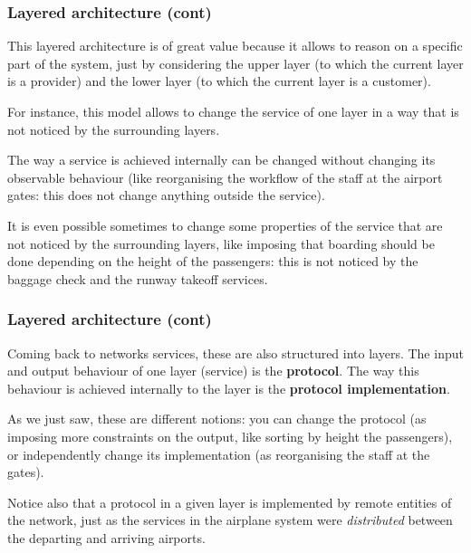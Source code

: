 %
\begin{frame}
\frametitle{Layered architecture (cont)}

This layered architecture is of great value because it allows to
reason on a specific part of the system, just by considering the upper
layer (to which the current layer is a provider) and the lower layer
(to which the current layer is a customer).

\bigskip

For instance, this model allows to change the service of one layer in
a way that is not noticed by the surrounding layers.

\bigskip

The way a service is achieved internally can be changed without
changing its observable behaviour (like reorganising the workflow of
the staff at the airport gates: this does not change anything outside
the service).

\bigskip

It is even possible sometimes to change some properties of the service
that are not noticed by the surrounding layers, like imposing that
boarding should be done depending on the height of the passengers:
this is not noticed by the baggage check and the runway takeoff
services.

\end{frame}

%
\begin{frame}
\frametitle{Layered architecture (cont)}

Coming back to networks services, these are also structured into
layers. The input and output behaviour of one layer (service) is the
\textbf{protocol}. The way this behaviour is achieved internally to
the layer is the \textbf{protocol implementation}.

\bigskip

As we just saw, these are different notions: you can change the
protocol (as imposing more constraints on the output, like sorting by
height the passengers), or independently change its implementation (as
reorganising the staff at the gates).

\bigskip

Notice also that a protocol in a given layer is implemented by remote
entities of the network, just as the services in the airplane system
were \emph{distributed} between the departing and arriving airports.

\end{frame}

